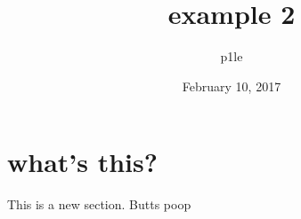 \documentclass[a4paper, 11pt]{article}
\begin{document}
\title{example 2}
\author{p1le}
\date{February 10, 2017}
\maketitle
\section{what's this?}
This is a new section. Butts
poop
\end{document}
